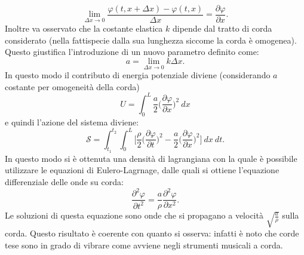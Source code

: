 \begin{equation*}
    \lim_{\Delta x\rightarrow 0}\frac{\varphi(t,x+\Delta x)-\varphi(t,x)}{\Delta x}=\frac{\partial \varphi}{\partial x}.
\end{equation*}
Inoltre va osservato che la costante elastica $k$ dipende dal tratto di corda considerato (nella fattispecie dalla sua lunghezza siccome la corda è omogenea). Questo giustifica l'introduzione di un nuovo parametro definito come:
\begin{equation*}
    a=\lim_{\Delta x\rightarrow 0}k\Delta x.
\end{equation*}
In questo modo il contributo di energia potenziale diviene (considerando $a$ costante per omogeneità della corda)
\begin{equation*}
    U=\int_{0}^{L} \frac{a}{2}\bigg(\frac{\partial \varphi}{\partial x}\bigg)^2\ dx
\end{equation*}
e quindi l'azione del sistema diviene:
\begin{equation}
    \mathcal{S} =\int_{t_1}^{t_2}\int_{0}^{L}\bigg[ \frac{\rho}{2}\bigg(\frac{\partial \varphi}{\partial t}\bigg)^2-\frac{a}{2}\bigg(\frac{\partial \varphi}{\partial x}\bigg)^2\bigg]\ dx\ dt.
\end{equation}
In questo modo si è ottenuta una densità di lagrangiana con la quale è possibile utilizzare le equazioni di Eulero-Lagrnage, dalle quali si ottiene l'equazione differenziale delle onde su corda:
\begin{equation*}
    \frac{\partial^2 \varphi}{\partial t^2}=\frac{a}{\rho}\frac{\partial^2 \varphi}{\partial x^2}.
\end{equation*}
Le soluzioni di questa equazione sono onde che si propagano a velocità $\sqrt{\frac{a}{\rho}}$ sulla corda. Questo risultato è coerente con quanto si osserva: infatti è noto che corde tese sono in grado di vibrare come avviene negli strumenti musicali a corda.